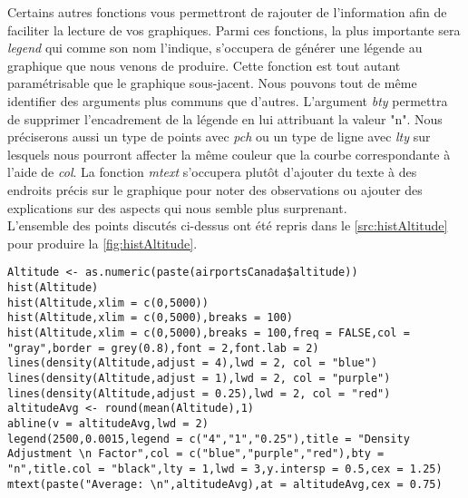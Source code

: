 \noindent
Certains autres fonctions vous permettront de rajouter de l'information afin de faciliter la lecture de vos graphiques. Parmi ces fonctions, la plus importante sera \emph{legend} qui comme son nom l'indique, s'occupera de générer une légende au graphique que nous venons de produire. Cette fonction est tout autant paramétrisable que le graphique sous-jacent. Nous pouvons tout de même identifier des arguments plus communs que d'autres. L'argument \emph{bty} permettra de supprimer l'encadrement de la légende en lui attribuant la valeur "n". Nous préciserons aussi un type de points avec \emph{pch} ou un type de ligne avec \emph{lty} sur lesquels nous pourront affecter la même couleur que la courbe correspondante à l'aide de \emph{col}. La fonction \emph{mtext} s'occupera plutôt d'ajouter du texte à des endroits précis sur le graphique pour noter des observations ou ajouter des explications sur des aspects qui nous semble plus surprenant. \\

\noindent
L'ensemble des points discutés ci-dessus ont été repris dans le \autoref{src:histAltitude} pour produire la \autoref{fig:histAltitude}. \\

\begin{lstlisting}[caption = {\emph{hist}, \emph{density}, \emph{lines}, \emph{abline}, \emph{legend} et \emph{mtext}},label=src:histAltitude]
Altitude <- as.numeric(paste(airportsCanada$altitude))
hist(Altitude)
hist(Altitude,xlim = c(0,5000))
hist(Altitude,xlim = c(0,5000),breaks = 100)
hist(Altitude,xlim = c(0,5000),breaks = 100,freq = FALSE,col = "gray",border = grey(0.8),font = 2,font.lab = 2)
lines(density(Altitude,adjust = 4),lwd = 2, col = "blue")
lines(density(Altitude,adjust = 1),lwd = 2, col = "purple")
lines(density(Altitude,adjust = 0.25),lwd = 2, col = "red")
altitudeAvg <- round(mean(Altitude),1)
abline(v = altitudeAvg,lwd = 2)
legend(2500,0.0015,legend = c("4","1","0.25"),title = "Density Adjustment \n Factor",col = c("blue","purple","red"),bty = "n",title.col = "black",lty = 1,lwd = 3,y.intersp = 0.5,cex = 1.25)
mtext(paste("Average: \n",altitudeAvg),at = altitudeAvg,cex = 0.75)
\end{lstlisting}


